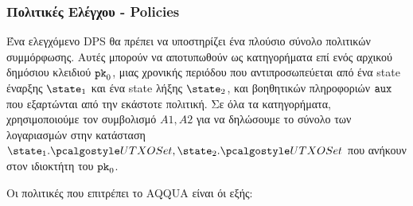 \subsubsection{Πολιτικές Ελέγχου - Policies}
Ένα ελεγχόμενο DPS θα πρέπει να υποστηρίζει ένα πλούσιο σύνολο πολιτικών συμμόρφωσης. Αυτές μπορούν να αποτυπωθούν ως κατηγορήματα επί ενός αρχικού δημόσιου κλειδιού $\textup{\texttt{pk}}_{0}$, μιας χρονικής περιόδου που αντιπροσωπεύεται από ένα state έναρξης $\snap_1$ και ένα state λήξης $\snap_2$, και βοηθητικών πληροφοριών ${\textup{\texttt{aux}}}$ που εξαρτώνται από την εκάστοτε πολιτική. Σε όλα τα κατηγορήματα, χρησιμοποιούμε τον συμβολισμό $A1, A2$ για να δηλώσουμε το σύνολο των λογαριασμών στην κατάσταση $\snap_1.\utxoset, \snap_2.\utxoset$ που ανήκουν στον ιδιοκτήτη του $\textup{\texttt{pk}}_{0}$.

Οι πολιτικές που επιτρέπει το AQQUA είναι όι εξής:

